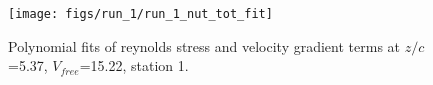 \begin{figure}[H]
\centering
\texttt{[image: figs/run\_1/run\_1\_nut\_tot\_fit]}
\caption{Polynomial fits of reynolds stress and velocity gradient terms at $z/c$=5.37, $V_{free}$=15.22, station 1.}
\label{fig:run_1_nut_tot_fit}
\end{figure}


